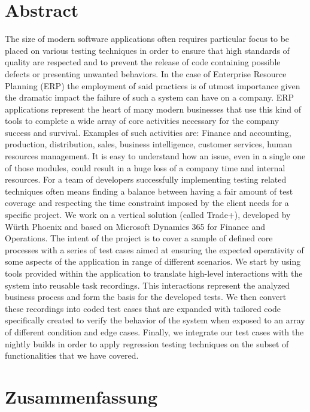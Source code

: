 \chapter*{Abstract} 

The size of modern software applications often requires particular focus to be placed on various testing techniques in order to ensure that high standards of quality are respected and to prevent the release of code containing possible defects or presenting unwanted behaviors. 
In the case of Enterprise Resource Planning (ERP) the employment of said practices is of utmost importance given the dramatic impact the failure of such a system can have on a company. 
ERP applications represent the heart of many modern businesses that use this kind of tools to complete a wide array of core activities necessary for the company success and survival. Examples of such activities are: 
Finance and accounting, production, distribution, sales, business intelligence, customer services, human resources management. 
It is easy to understand how an issue, even in a single one of those modules, could result in a huge loss of a company time and internal resources. 
For a team of developers successfully implementing testing related techniques often means finding a balance between having a fair amount of test coverage and respecting the time constraint imposed by the client needs for a specific project. We work on a vertical solution (called Trade+), developed by Würth Phoenix and based on Microsoft Dynamics 365 for Finance and Operations. The intent of the project is to cover a sample of defined core processes with a series of test cases aimed at ensuring the expected operativity of some aspects of the application in range of different scenarios. We start by using tools provided within the application to translate high-level interactions with the system into reusable task recordings. This interactions represent the analyzed business process and form the basis for the developed tests. We then convert these recordings into coded test cases that are expanded with tailored code specifically created to verify the behavior of the system when exposed to an array of different condition and edge cases. Finally, we integrate our test cases with the nightly builds in order to apply regression testing techniques on the subset of functionalities that we have covered. 

\chapter*{Zusammenfassung}

